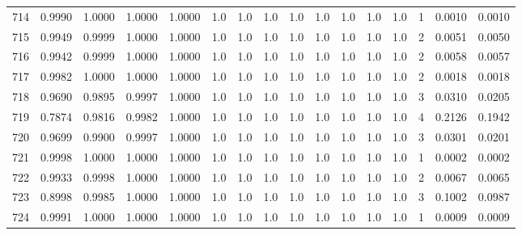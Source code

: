\begin{tabular}{lrrrrrrrrrrrrrrr}
714 &      0.9990 &  1.0000 &  1.0000 &  1.0000 &     1.0 &     1.0 &     1.0 &     1.0 &     1.0 &     1.0 &      1.0 &        1.0 &      1 &                    0.0010 &                     0.0010 \\
715 &      0.9949 &  0.9999 &  1.0000 &  1.0000 &     1.0 &     1.0 &     1.0 &     1.0 &     1.0 &     1.0 &      1.0 &        1.0 &      2 &                    0.0051 &                     0.0050 \\
716 &      0.9942 &  0.9999 &  1.0000 &  1.0000 &     1.0 &     1.0 &     1.0 &     1.0 &     1.0 &     1.0 &      1.0 &        1.0 &      2 &                    0.0058 &                     0.0057 \\
717 &      0.9982 &  1.0000 &  1.0000 &  1.0000 &     1.0 &     1.0 &     1.0 &     1.0 &     1.0 &     1.0 &      1.0 &        1.0 &      2 &                    0.0018 &                     0.0018 \\
718 &      0.9690 &  0.9895 &  0.9997 &  1.0000 &     1.0 &     1.0 &     1.0 &     1.0 &     1.0 &     1.0 &      1.0 &        1.0 &      3 &                    0.0310 &                     0.0205 \\
719 &      0.7874 &  0.9816 &  0.9982 &  1.0000 &     1.0 &     1.0 &     1.0 &     1.0 &     1.0 &     1.0 &      1.0 &        1.0 &      4 &                    0.2126 &                     0.1942 \\
720 &      0.9699 &  0.9900 &  0.9997 &  1.0000 &     1.0 &     1.0 &     1.0 &     1.0 &     1.0 &     1.0 &      1.0 &        1.0 &      3 &                    0.0301 &                     0.0201 \\
721 &      0.9998 &  1.0000 &  1.0000 &  1.0000 &     1.0 &     1.0 &     1.0 &     1.0 &     1.0 &     1.0 &      1.0 &        1.0 &      1 &                    0.0002 &                     0.0002 \\
722 &      0.9933 &  0.9998 &  1.0000 &  1.0000 &     1.0 &     1.0 &     1.0 &     1.0 &     1.0 &     1.0 &      1.0 &        1.0 &      2 &                    0.0067 &                     0.0065 \\
723 &      0.8998 &  0.9985 &  1.0000 &  1.0000 &     1.0 &     1.0 &     1.0 &     1.0 &     1.0 &     1.0 &      1.0 &        1.0 &      3 &                    0.1002 &                     0.0987 \\
724 &      0.9991 &  1.0000 &  1.0000 &  1.0000 &     1.0 &     1.0 &     1.0 &     1.0 &     1.0 &     1.0 &      1.0 &        1.0 &      1 &                    0.0009 &                     0.0009 \\

\end{tabular}

